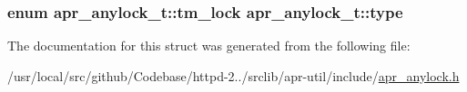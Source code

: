 \subsubsection[{\texorpdfstring{type}{type}}]{\setlength{\rightskip}{0pt plus 5cm}enum {\bf apr\+\_\+anylock\+\_\+t\+::tm\+\_\+lock}  apr\+\_\+anylock\+\_\+t\+::type}\hypertarget{structapr__anylock__t_abe78b2ee0daaee1b19c952c4f8fc903a}{}\label{structapr__anylock__t_abe78b2ee0daaee1b19c952c4f8fc903a}


The documentation for this struct was generated from the following file\+:\begin{DoxyCompactItemize}
\item 
/usr/local/src/github/\+Codebase/httpd-\/2../srclib/apr-\/util/include/\hyperlink{apr__anylock_8h}{apr\+\_\+anylock.\+h}\end{DoxyCompactItemize}
